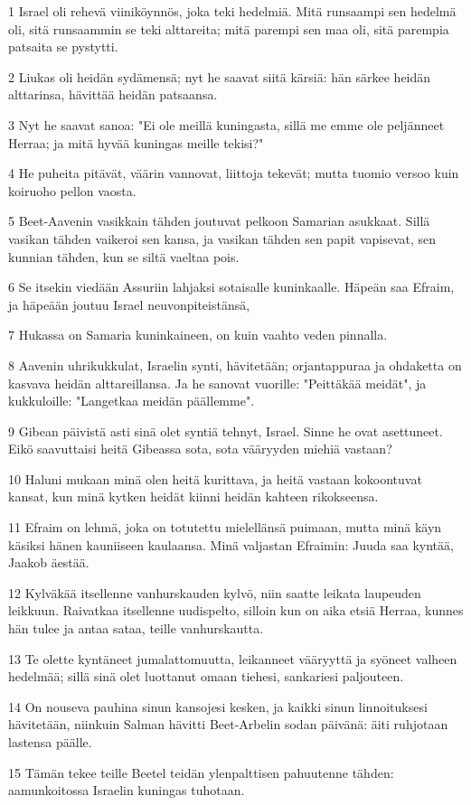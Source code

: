 \par 1 Israel oli rehevä viiniköynnös, joka teki hedelmiä. Mitä runsaampi sen hedelmä oli, sitä runsaammin se teki alttareita; mitä parempi sen maa oli, sitä parempia patsaita se pystytti.
\par 2 Liukas oli heidän sydämensä; nyt he saavat siitä kärsiä: hän särkee heidän alttarinsa, hävittää heidän patsaansa.
\par 3 Nyt he saavat sanoa: "Ei ole meillä kuningasta, sillä me emme ole peljänneet Herraa; ja mitä hyvää kuningas meille tekisi?"
\par 4 He puheita pitävät, väärin vannovat, liittoja tekevät; mutta tuomio versoo kuin koiruoho pellon vaosta.
\par 5 Beet-Aavenin vasikkain tähden joutuvat pelkoon Samarian asukkaat. Sillä vasikan tähden vaikeroi sen kansa, ja vasikan tähden sen papit vapisevat, sen kunnian tähden, kun se siltä vaeltaa pois.
\par 6 Se itsekin viedään Assuriin lahjaksi sotaisalle kuninkaalle. Häpeän saa Efraim, ja häpeään joutuu Israel neuvonpiteistänsä,
\par 7 Hukassa on Samaria kuninkaineen, on kuin vaahto veden pinnalla.
\par 8 Aavenin uhrikukkulat, Israelin synti, hävitetään; orjantappuraa ja ohdaketta on kasvava heidän alttareillansa. Ja he sanovat vuorille: "Peittäkää meidät", ja kukkuloille: "Langetkaa meidän päällemme".
\par 9 Gibean päivistä asti sinä olet syntiä tehnyt, Israel. Sinne he ovat asettuneet. Eikö saavuttaisi heitä Gibeassa sota, sota vääryyden miehiä vastaan?
\par 10 Haluni mukaan minä olen heitä kurittava, ja heitä vastaan kokoontuvat kansat, kun minä kytken heidät kiinni heidän kahteen rikokseensa.
\par 11 Efraim on lehmä, joka on totutettu mielellänsä puimaan, mutta minä käyn käsiksi hänen kauniiseen kaulaansa. Minä valjastan Efraimin: Juuda saa kyntää, Jaakob äestää.
\par 12 Kylväkää itsellenne vanhurskauden kylvö, niin saatte leikata laupeuden leikkuun. Raivatkaa itsellenne uudispelto, silloin kun on aika etsiä Herraa, kunnes hän tulee ja antaa sataa, teille vanhurskautta.
\par 13 Te olette kyntäneet jumalattomuutta, leikanneet vääryyttä ja syöneet valheen hedelmää; sillä sinä olet luottanut omaan tiehesi, sankariesi paljouteen.
\par 14 On nouseva pauhina sinun kansojesi kesken, ja kaikki sinun linnoituksesi hävitetään, niinkuin Salman hävitti Beet-Arbelin sodan päivänä: äiti ruhjotaan lastensa päälle.
\par 15 Tämän tekee teille Beetel teidän ylenpalttisen pahuutenne tähden: aamunkoitossa Israelin kuningas tuhotaan.

